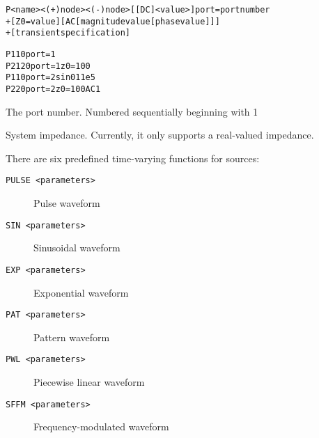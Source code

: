 


\begin{Device}\label{P_DEVICE}


\device
\begin{alltt}
P<name> <(+) node> <(-) node> [[DC] <value> ] port=port number
+ [Z0 = value] [AC [magnitude value [phase value] ] ]
+ [transient specification]
\end{alltt}

\examples
\begin{alltt}
P1 1 0 port = 1
P2 12 0  port=1  z0=100
P1 1 0 port=2   sin 0  1 1e5
P2 2 0 port=2 z0=100 AC 1
\end{alltt}


\parameters

\begin{Parameters}


The port number. Numbered sequentially beginning with 1


System impedance. Currently, it only supports a real-valued impedance.


There are six predefined time-varying functions for sources:

\begin{description}
\item[\tt PULSE <parameters>] Pulse waveform
\item[\tt SIN <parameters>] Sinusoidal waveform
\item[\tt EXP <parameters>] Exponential waveform
\item[\tt PAT <parameters>] Pattern waveform
\item[\tt PWL <parameters>] Piecewise linear waveform
\item[\tt SFFM <parameters>] Frequency-modulated waveform
\end{description}

\end{Parameters}


\end{Device}
